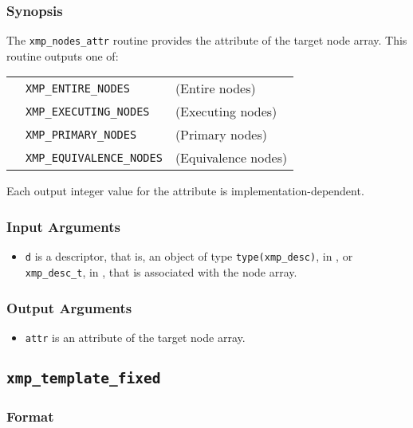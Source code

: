 \subsubsection*{Synopsis}

The {\tt xmp\_nodes\_attr} routine provides the attribute of the target node array. This routine outputs one of:

\begin{tabular}{lll}
  \hspace{2.5cm} & {\tt XMP\_ENTIRE\_NODES} & (Entire nodes)\\
                 & {\tt XMP\_EXECUTING\_NODES}  & (Executing nodes) \\
                 & {\tt XMP\_PRIMARY\_NODES} & (Primary nodes) \\
                 & {\tt XMP\_EQUIVALENCE\_NODES} & (Equivalence nodes) \\
\end{tabular}

  Each output integer value for the attribute is implementation-dependent.

\subsubsection*{Input Arguments}
\begin{itemize}
 \item {\tt d} is a descriptor, that is, an object of type 
       {\tt type(xmp\_desc)}, in {\XMPF}, or {\tt xmp\_desc\_t},
       in {\XMPC}, that is associated with the node array.
\end{itemize}

\subsubsection*{Output Arguments}
\begin{itemize}
 \item {\tt attr} is an attribute of the target node array.
\end{itemize}

\subsection{\tt xmp\_template\_fixed}

\subsubsection*{Format}

